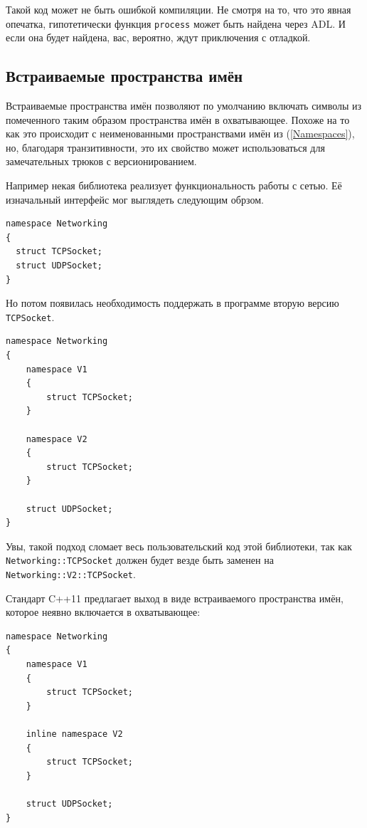 \documentclass[a4paper,12pt,oneside]{book}
\begin{document}
Такой код может не быть ошибкой компиляции. Не смотря на то, что это явная опечатка, гипотетически функция \lstinline!process! может быть найдена через ADL. И если она будет найдена, вас, вероятно, ждут приключения с отладкой.

\subsection{Встраиваемые пространства имён}\label{InlineNameSpaces}

Встраиваемые пространства имён позволяют по умолчанию включать символы из помеченного таким образом пространства имён в охватывающее. Похоже на то как это происходит с неименованными пространствами имён из (\ref{Namespaces}), но, благодаря транзитивности, это их свойство может использоваться для замечательных трюков с версионированием.

Например некая библиотека реализует функциональность работы с сетью. Её изначальный интерфейс мог выглядеть следующим обрзом.

\begin{lstlisting}
namespace Networking 
{
  struct TCPSocket;
  struct UDPSocket;
}
\end{lstlisting}

Но потом появилась необходимость поддержать в программе вторую версию \lstinline!TCPSocket!.

\begin{lstlisting}
namespace Networking 
{
    namespace V1 
    {
        struct TCPSocket;
    }
     
    namespace V2 
    {
        struct TCPSocket;
    }
 
    struct UDPSocket;
}
\end{lstlisting}

Увы, такой подход сломает весь пользовательский код этой библиотеки, так как \lstinline!Networking::TCPSocket! должен будет везде быть заменен на \lstinline!Networking::V2::TCPSocket!.

Стандарт C++11 предлагает выход в виде встраиваемого пространства имён, которое неявно включается в охватывающее:

\begin{lstlisting}
namespace Networking 
{
    namespace V1 
    {
        struct TCPSocket;
    }
     
    inline namespace V2 
    {
        struct TCPSocket;
    }
 
    struct UDPSocket;
}
\end{lstlisting}
\end{document}
